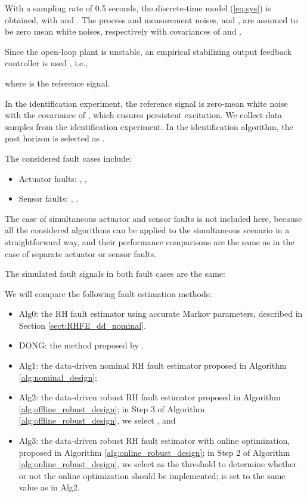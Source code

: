 \documentclass[twocolumn]{autart}
\begin{document}
With a sampling rate of 0.5 seconds, the discrete-time model (\ref{eq:sys}) is obtained, with  and . The process and measurement noises,  and , are assumed to be zero mean white noises, respectively with covariances of  and .

Since the open-loop plant is unstable, an empirical stabilizing output feedback controller is used \cite{Dong2012c}, i.e.,

where  is the reference signal.



In the identification experiment, the reference signal  is zero-mean white noise with the covariance of , which ensures persistent excitation.
We collect  data samples from the identification experiment. In the identification algorithm, the past horizon is selected as .

The considered fault cases include:
\begin{itemize}
  \item Actuator faults: , ,
  \item Sensor faults: , .
\end{itemize}
The case of simultaneous actuator and sensor faults is not included here, because all the considered algorithms can be applied to the simultaneous scenario in a straightforward way, and their performance comparisons are the same as in the case of separate actuator or sensor faults.

The simulated fault signals in both fault cases are the same:


We will compare the following fault estimation methods:
\begin{itemize}
  \item Alg0: the RH fault estimator using accurate Markov parameters, described in Section \ref{sect:RHFE_dd_nominal}.
  \item DONG: the method proposed by \cite{Dong2012c}.
  \item Alg1: the data-driven nominal RH fault estimator  proposed in Algorithm \ref{alg:nominal_design};
  \item Alg2: the data-driven robust RH fault estimator  proposed in Algorithm \ref{alg:offline_robust_design}; in Step 3 of Algorithm \ref{alg:offline_robust_design}, we select , and
      
  \item Alg3: the data-driven robust RH fault estimator  with online optimization, proposed in Algorithm \ref{alg:online_robust_design}; in Step 2 of Algorithm \ref{alg:online_robust_design}, we select  as the threshold to determine whether or not the online optimization should be implemented;  is set to the same value as in Alg2.
\end{itemize}
\end{document}
